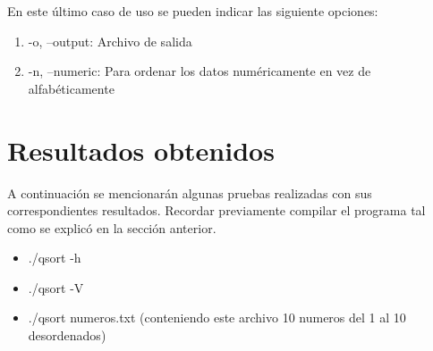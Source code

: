 \documentclass[a4paper,10pt]{article}
\numberwithin{equation}{section}
\numberwithin{figure}{section}
\begin{document}
En este último caso de uso se pueden indicar las siguiente opciones:

\begin{enumerate}
	\item -o, --output: Archivo de salida
	\item -n, --numeric: Para ordenar los datos numéricamente en vez de alfabéticamente
\end{enumerate}


\section{Resultados obtenidos}


A continuación se mencionarán algunas pruebas realizadas con sus correspondientes resultados. Recordar previamente compilar el programa tal como se explicó en la sección anterior.

\begin{itemize}
\item  ./qsort -h
\end{itemize}
\noindent{}
	

\begin{itemize}
\item  ./qsort -V
\end{itemize}
\noindent{}

\begin{itemize}
\item  ./qsort numeros.txt (conteniendo este archivo 10 numeros del 1 al 10 desordenados)
\end{itemize}
\noindent{}
\end{document}
